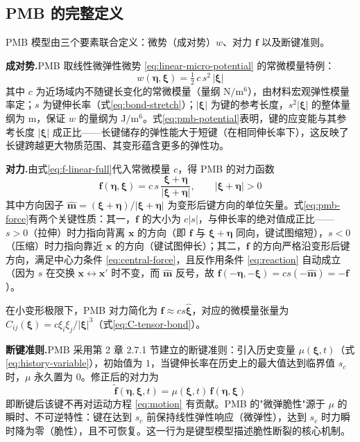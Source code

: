 \subsection{PMB 的完整定义}

PMB 模型由三个要素联合定义：微势（成对势）$w$、对力 $\mathbf{f}$ 以及断键准则。

\textbf{成对势.}PMB 取线性微弹性微势 \eqref{eq:linear-micro-potential} 的常微模量特例：
\begin{equation}
w(\boldsymbol{\eta},\boldsymbol{\xi}) = \tfrac{1}{2}\,c\,s^{2}\,|\boldsymbol{\xi}|
\label{eq:pmb-potential}
\end{equation}
其中 $c$ 为近场域内不随键长变化的常微模量（量纲 $\mathrm{N}/\mathrm{m}^{6}$），由材料宏观弹性模量率定；$s$ 为键伸长率（式\eqref{eq:bond-stretch}）；$|\boldsymbol{\xi}|$ 为键的参考长度，$s^{2}|\boldsymbol{\xi}|$ 的整体量纲为 $\mathrm{m}$，保证 $w$ 的量纲为 $\mathrm{J}/\mathrm{m}^{6}$。式\eqref{eq:pmb-potential}表明，键的应变能与其参考长度 $|\boldsymbol{\xi}|$ 成正比——长键储存的弹性能大于短键（在相同伸长率下），这反映了长键跨越更大物质范围、其变形蕴含更多的弹性功。

\textbf{对力.}由式\eqref{eq:f-linear-full}代入常微模量 $c$，得 PMB 的对力函数
\begin{equation}
\mathbf{f}(\boldsymbol{\eta},\boldsymbol{\xi}) = c\,s\,\frac{\boldsymbol{\xi}+\boldsymbol{\eta}}{|\boldsymbol{\xi}+\boldsymbol{\eta}|},\qquad
|\boldsymbol{\xi}+\boldsymbol{\eta}| > 0
\label{eq:pmb-force}
\end{equation}
其中方向因子 $\hat{\mathbf{m}}=(\boldsymbol{\xi}+\boldsymbol{\eta})/|\boldsymbol{\xi}+\boldsymbol{\eta}|$ 为变形后键方向的单位矢量。式\eqref{eq:pmb-force}有两个关键性质：其一，$\mathbf{f}$ 的大小为 $c|s|$，与伸长率的绝对值成正比——$s>0$（拉伸）时力指向背离 $\mathbf{x}$ 的方向（即 $\mathbf{f}$ 与 $\boldsymbol{\xi}+\boldsymbol{\eta}$ 同向，键试图缩短），$s<0$（压缩）时力指向靠近 $\mathbf{x}$ 的方向（键试图伸长）；其二，$\mathbf{f}$ 的方向严格沿变形后键方向，满足中心力条件 \eqref{eq:central-force}，且反作用条件 \eqref{eq:reaction} 自动成立（因为 $s$ 在交换 $\mathbf{x}\leftrightarrow\mathbf{x}'$ 时不变，而 $\hat{\mathbf{m}}$ 反号，故 $\mathbf{f}(-\boldsymbol{\eta},-\boldsymbol{\xi})=c s(-\hat{\mathbf{m}})=-\mathbf{f}$）。

在小变形极限下，PMB 对力简化为 $\mathbf{f}\approx c s \hat{\boldsymbol{\xi}}$，对应的微模量张量为 $C_{ij}(\boldsymbol{\xi})=c\xi_i\xi_j/|\boldsymbol{\xi}|^{3}$（式\eqref{eq:C-tensor-bond}）。

\textbf{断键准则.}PMB 采用第 2 章 2.7.1 节建立的断键准则：引入历史变量 $\mu(\boldsymbol{\xi},t)$（式\eqref{eq:history-variable}），初始值为 $1$，当键伸长率在历史上的最大值达到临界值 $s_c$ 时，$\mu$ 永久置为 $0$。修正后的对力为
\begin{equation}
\tilde{\mathbf{f}}(\boldsymbol{\eta},\boldsymbol{\xi},t) = \mu(\boldsymbol{\xi},t)\,\mathbf{f}(\boldsymbol{\eta},\boldsymbol{\xi})
\label{eq:pmb-damaged-force}
\end{equation}
即断键后该键不再对运动方程 \eqref{eq:motion} 有贡献。PMB 的"微弹脆性"源于 $\mu$ 的瞬时、不可逆特性：键在达到 $s_c$ 前保持线性弹性响应（微弹性），达到 $s_c$ 时力瞬时降为零（脆性），且不可恢复。这一行为是键型模型描述脆性断裂的核心机制。

